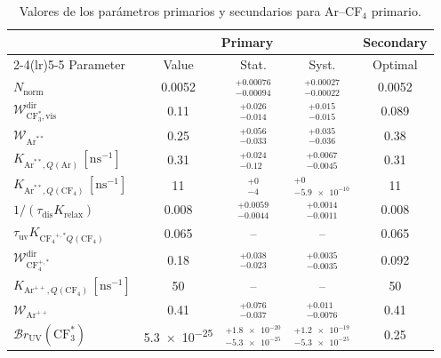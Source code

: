 \begin{table}[htbp]
\centering
\caption{Valores de los parámetros primarios y secundarios para Ar--CF$_4$ primario.}
\label{tab:ArCF4_primary_param_secondary}
\begin{tabular}{lcccc}
\toprule
 & \multicolumn{3}{c}{Primary} & \multicolumn{1}{c}{Secondary} \\
\cmidrule(lr){2-4}\cmidrule(lr){5-5}
Parameter & Value & Stat. & Syst. & Optimal \\
\midrule
$N_{\mathrm{norm}}$ & \num{0.0052} & $^{+\num{0.00076}}_{-\num{0.00094}}$ & $^{+\num{0.00027}}_{-\num{0.00022}}$ & \num{0.0052} \\
$\mathcal{W}_{\mathrm{CF}_3^*,\mathrm{vis}}^{\mathrm{dir}}$ & \num{0.11} & $^{+\num{0.026}}_{-\num{0.014}}$ & $^{+\num{0.015}}_{-\num{0.015}}$ & \num{0.089} \\
$\mathcal{W}_{\mathrm{Ar}^{**}}$ & \num{0.25} & $^{+\num{0.056}}_{-\num{0.033}}$ & $^{+\num{0.035}}_{-\num{0.036}}$ & \num{0.38} \\
$K_{\mathrm{Ar}^{**},Q(\mathrm{Ar})}\,[\mathrm{ns}^{-1}]$ & \num{0.31} & $^{+\num{0.024}}_{-\num{0.12}}$ & $^{+\num{0.0067}}_{-\num{0.0045}}$ & \num{0.31} \\
$K_{\mathrm{Ar}^{**},Q(\mathrm{CF}_4)}\,[\mathrm{ns}^{-1}]$ & \num{11} & $^{+\num{0}}_{-\num{4}}$ & $^{+\num{0}}_{-\num{5.9e-10}}$ & \num{11} \\
$1/(\tau_{\mathrm{dis}}K_{\mathrm{relax}})$ & \num{0.008} & $^{+\num{0.0059}}_{-\num{0.0044}}$ & $^{+\num{0.0014}}_{-\num{0.0011}}$ & \num{0.008} \\
$\tau_{\mathrm{uv}}K_{\mathrm{CF_4}^{+,*}Q(\mathrm{CF}_4)}$ & \num{0.065} & -- & -- & \num{0.065} \\
$\mathcal{W}_{\mathrm{CF}_4^{+,*}}^{\mathrm{dir}}$ & \num{0.18} & $^{+\num{0.038}}_{-\num{0.023}}$ & $^{+\num{0.0035}}_{-\num{0.0035}}$ & \num{0.092} \\
$K_{\mathrm{Ar}^{++},Q(\mathrm{CF}_4)}\,[\mathrm{ns}^{-1}]$ & \num{50} & -- & -- & \num{50} \\
$\mathcal{W}_{\mathrm{Ar}^{++}}$ & \num{0.41} & $^{+\num{0.076}}_{-\num{0.037}}$ & $^{+\num{0.011}}_{-\num{0.0076}}$ & \num{0.41} \\
$\mathcal{B}r_{\mathrm{UV}}(\mathrm{CF}_3^*)$ & \num{5.3e-25} & $^{+\num{1.8e-20}}_{-\num{5.3e-25}}$ & $^{+\num{1.2e-19}}_{-\num{5.3e-25}}$ & \num{0.25} \\
\bottomrule
\end{tabular}
\end{table}
